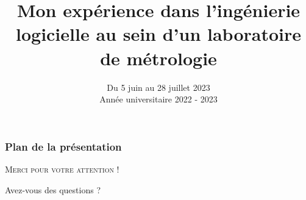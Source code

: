 \documentclass[pdf]{beamer}
\title[Mon expérience dans l'ingénierie logicielle]{Mon expérience dans l'ingénierie logicielle au sein d'un laboratoire de métrologie}
\author[Tristan A-S]{\personne{Tristan}{Amiotte-Suchet}}
\institute{Université de Franche Comté}
\date{Du 5 juin au 28 juillet 2023 \\ Année universitaire 2022 - 2023}
\begin{document}

\begin{frame}
    \frametitle{Plan de la présentation}
    \tableofcontents[hideallsubsections]
\end{frame}











\appendix
\begin{frame}
    \scshape\huge\centering
    \vspace{1cm}
    Merci pour votre attention !\par
    \vspace{2cm}
    Avez-vous des questions ?\par
\end{frame}
\end{document}
